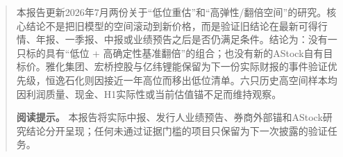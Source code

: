 \documentclass[a4paper,11pt,openany,fontset=none]{ctexrep}
\begin{document}
\astockcover
\begin{abstract}
本报告更新2026年7月两份关于“低位重估”和“高弹性/翻倍空间”的研究。核心结论不是把旧模型的空间滚动到新价格，而是验证旧结论在最新可得行情、年报、一季报、中报或业绩预告之后是否仍满足条件。结论为：没有一只标的具有“低位 + 高确定性基准翻倍”的组合；也没有新的AStock自有目标价。雅化集团、宏桥控股与亿纬锂能保留为下一份实际财报的事件验证优先级，恒逸石化则因接近一年高位而移出低位清单。六只历史高空间样本均因利润质量、现金、H1实际性或当前估值锚不足而维持观察。

\textbf{阅读提示。} 本报告将实际中报、发行人业绩预告、券商外部锚和AStock研究结论分开呈现；任何未通过证据门槛的项目只保留为下一次披露的验证任务。
\end{abstract}
\tableofcontents
\clearpage








\appendix

\end{document}
